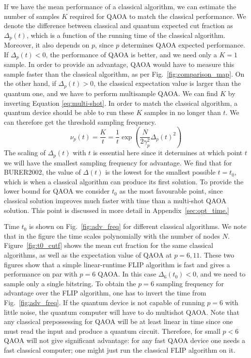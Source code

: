 \documentclass[prb,reprint,nofootinbib,longbibliography,superscriptaddress]{revtex4-1}
\begin{document}
If we have the mean performance of a classical algorithm, we can estimate the number of samples $K$ required for QAOA to match the classical performance. We denote the difference between classical and quantum expected cut fraction as $\Delta_p(t)$, which is a function of the running time of the classical algorithm. Moreover, it also depends on $p$, since $p$ determines QAOA expected performance. If $\Delta_p(t) < 0$, the performance of QAOA is better, and we  need only a $K=1$ sample. In order to provide an advantage, QAOA would have to measure this sample faster than the classical algorithm, as per Fig.~\ref{fig:comparison_map}. On the other hand, if $\Delta_p(t) > 0$, the classical expectation value is larger than the quantum one, and we have to perform multisample QAOA. We can find $K$ by inverting Equation \ref{eq:multi-shot}. In order to match the classical algorithm, a quantum device should be able to run these $K$ samples in no longer than $t$. We can therefore get the threshold sampling frequency.
\begin{equation}
   \nu_p(t) = \frac{K}{t} = \frac{1}{t}\exp \left({\frac{N}{2\gamma_p^2}\Delta_p(t) ^2} \right)
\end{equation}
The scaling of $\Delta_p(t)$ with $t$ is essential here since it determines at which point $t$ we will have the smallest sampling frequency for advantage. We find that for BURER2002, the value of $\Delta(t)$ is the lowest for the smallest possible $t=t_0$, which is when a classical algorithm can produce its first solution. To provide the lower bound for QAOA we consider $t_0$ as the most favourable point, since classical solution improves much faster with time than a multi-shot QAOA solution. This point is discussed in more detail in Appendix~\ref{sec:opt_time.}

Time $t_0$ is shown on Fig.~\ref{fig:adv_freq} for different classical algorithms. We note that in the figure
the time scales polynomially with the number of nodes $N$. Figure~\ref{fig:t0_cutf} shows the mean cut fraction for the same classical algorithms, as well as the expectation value of QAOA at $p=6, 11$. These two figures show that a simple linear-runtime FLIP algorithm is fast and gives a performance on par with $p=6$ QAOA. In this case $\Delta_6(t_0) < 0$, and we  need to sample only a single bitstring. To obtain the $p=6$ sampling frequency for advantage over the FLIP algorithm, one has to invert the time from Fig.~\ref{fig:adv_freq}. If the quantum device is not capable of running $p=6$ with little noise, the quantum computer will have to do multishot QAOA. Note that any classical prepossessing for QAOA will be at least linear in time since one must read the input and produce a quantum circuit. Therefore, for small $p<6$ QAOA will not give significant advantage: for any fast QAOA device one needs a fast classical computer; one might just run the classical FLIP algorithm on it.
\end{document}

